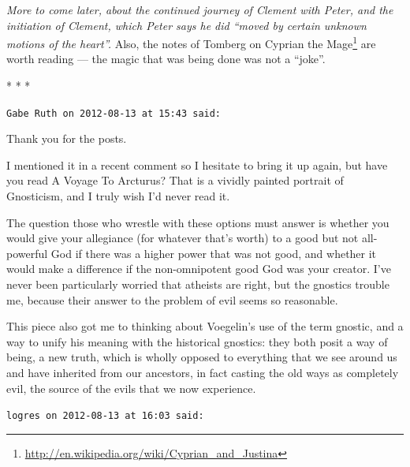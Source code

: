 \emph{More to come later, about the continued journey of Clement with Peter, and the initiation of Clement, which Peter says he did ``moved by certain unknown motions of the heart''.} Also, the notes of Tomberg on Cyprian the Mage\footnote{\url{http://en.wikipedia.org/wiki/Cyprian\_and\_Justina}} are worth reading --- the magic that was being done was not a ``joke''.



\begin{center}* * *\end{center}

\begin{footnotesize}
\begin{sffamily}
\texttt{Gabe Ruth on 2012-08-13 at 15:43 said:}

Thank you for the posts.

I mentioned it in a recent comment so I hesitate to bring it up again, but have you read A Voyage To Arcturus? That is a vividly painted portrait of Gnosticism, and I truly wish I'd never read it.

The question those who wrestle with these options must answer is whether you would give your allegiance (for whatever that's worth) to a good but not all-powerful God if there was a higher power that was not good, and whether it would make a difference if the non-omnipotent good God was your creator. I've never been particularly worried that atheists are right, but the gnostics trouble me, because their answer to the problem of evil seems so reasonable.

This piece also got me to thinking about Voegelin's use of the term gnostic, and a way to unify his meaning with the historical gnostics: they both posit a way of being, a new truth, which is wholly opposed to everything that we see around us and have inherited from our ancestors, in fact casting the old ways as completely evil, the source of the evils that we now experience.

\hfill

\texttt{logres on 2012-08-13 at 16:03 said:}


\end{sffamily}
\end{footnotesize}
